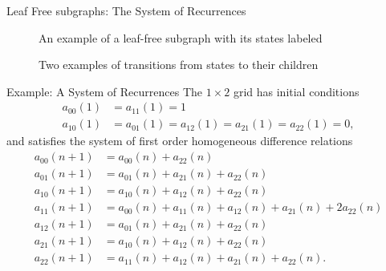 \documentclass{beamer}%
\newcommand\indxx[2]{#1#2}
\begin{document}
\begin{frame}{Leaf Free subgraphs: The System of Recurrences}
  \begin{figure}
    
    \caption{An example of a leaf-free subgraph with its states labeled}
  \end{figure}
  \begin{figure}
    
    \caption{Two examples of transitions from states to their children}
  \end{figure}
\end{frame}
%
\begin{frame}{Example: A System of Recurrences}
  The $1 \times 2$ grid has initial conditions
  \begin{align*}
    a_{\indxx 00}(1) &= a_{\indxx 11}(1) = 1 \\
    a_{\indxx 10}(1) &= a_{\indxx 01}(1) = a_{\indxx 12}(1) = a_{\indxx 21}(1) = a_{\indxx 22}(1) = 0,
  \end{align*}
  and satisfies the system of first order homogeneous difference relations
  \begin{align*}
    a_{\indxx 00}(n + 1) &= a_{\indxx 00}(n) + a_{\indxx 22}(n) \\
    a_{\indxx 01}(n + 1) &= a_{\indxx 01}(n) + a_{\indxx 21}(n) + a_{\indxx 22}(n) \\
    a_{\indxx 10}(n + 1) &= a_{\indxx 10}(n) + a_{\indxx 12}(n) + a_{\indxx 22}(n) \\
    a_{\indxx 11}(n + 1) &= a_{\indxx 00}(n) + a_{\indxx 11}(n) + a_{\indxx 12}(n)
                      + a_{\indxx 21}(n) + 2a_{\indxx 22}(n) \\
    a_{\indxx 12}(n + 1) &= a_{\indxx 01}(n) + a_{\indxx 21}(n) + a_{\indxx 22}(n) \\
    a_{\indxx 21}(n + 1) &= a_{\indxx 10}(n) + a_{\indxx 12}(n) + a_{\indxx 22}(n) \\
    a_{\indxx 22}(n + 1) &= a_{\indxx 11}(n) + a_{\indxx 12}(n) + a_{\indxx 21}(n) + a_{\indxx 22}(n).
  \end{align*}
\end{frame}
\end{document}
